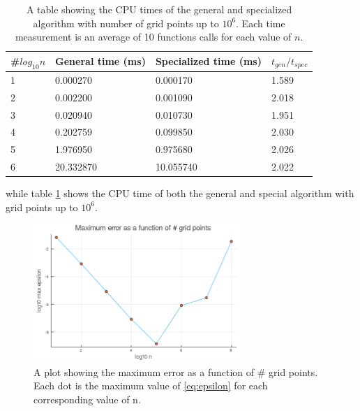 \documentclass[a4paper,10pt,English]{article}
\begin{document}
\begin{table}[] \label{tab: CPU_t} \centering
\begin{tabular}{|l|l|l|l|}
\hline
\textbf{\#$log_{10} n$} & \textbf{General time (ms)} & \textbf{Specialized time (ms)} & \textbf{$t_{gen}/t_{spec}$} \\ \hline
1                       & 0.000270                    &  0.000170                         & 1.589                       \\ \hline
2                       & 0.002200                     & 0.001090                         & 2.018                       \\ \hline
3                       & 0.020940                     & 0.010730                         & 1.951                       \\ \hline
4                       & 0.202759                     & 0.099850                         & 2.030                       \\ \hline
5                       & 1.976950                     & 0.975680                         & 2.026                       \\ \hline
6                       & 20.332870                   & 10.055740                        & 2.022                       \\ \hline
\end{tabular}
\caption{A table showing the CPU times of the general and specialized algorithm with number of grid points up to $10^6$. Each time measurement is an average of 10 functions calls for each value of $n$.}
\end{table}

while table \ref{tab: CPU_t} shows the CPU time of both the general and special algorithm with grid points up to $10^6$.

\begin{figure}
    \centering
    \includegraphics[width=0.7\textwidth]{max_error.png}
    \caption{A plot showing the maximum error as a function of # grid points. Each dot is the maximum value of \ref{eq:epsilon} for each corresponding value of n.}
    \label{fig:epsilon}
\end{figure}
\end{document}
